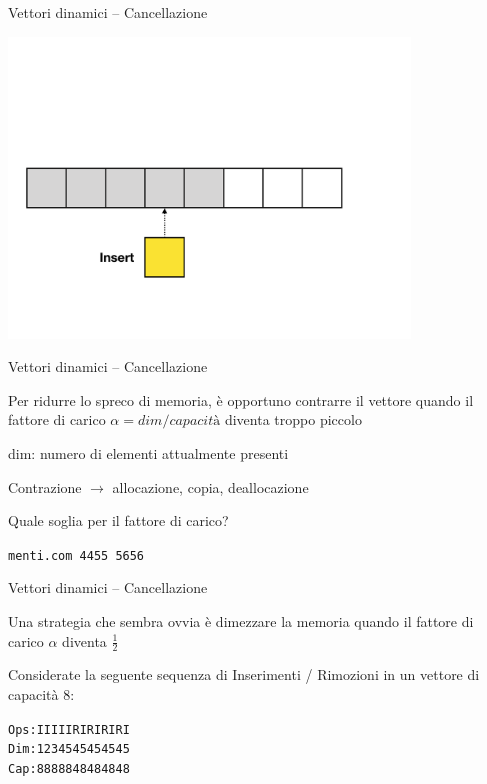 \begin{frame}{Vettori dinamici -- Cancellazione}
\begin{overprint}
\centerline{\includegraphics[width=0.8\textwidth,page=8]{append-insert.pdf}}
\end{overprint}


\end{frame}

\begin{frame}{Vettori dinamici -- Cancellazione}

\vspace{-9pt}
\begin{myboxtitle}[Contrazione]
Per ridurre lo spreco di memoria, è opportuno contrarre il vettore quando il \alert{fattore di carico $\alpha = \textit{dim} / \textit{capacità}$} diventa troppo piccolo

\BI
\item \alert{dim}: numero di elementi attualmente presenti
\item Contrazione $\rightarrow$ allocazione, copia, deallocazione
\EI
\end{myboxtitle}

\begin{myboxtitle}[Domanda]
Quale soglia per il fattore di carico?
\end{myboxtitle}

\bigskip
{\Large
\texttt{menti.com 		4455 5656}
}


\end{frame}

\begin{frame}[fragile]{Vettori dinamici -- Cancellazione}
	
\vspace{-9pt}
\begin{myboxtitle}
Una strategia che sembra ovvia è dimezzare la memoria quando il fattore di carico $\alpha$ diventa $\frac{1}{2}$
\end{myboxtitle}


\pause
\bigskip
Considerate la seguente sequenza di \alert{I}nserimenti / \alert{R}imozioni in un vettore di capacità $8$:
\begin{alltt}
Ops: I I I I I R I R I R I R I
Dim: 1 2 3 4 5 4 5 4 5 4 5 4 5
Cap: 8 8 8 8 8 4 8 4 8 4 8 4 8
\end{alltt}

\end{frame}

